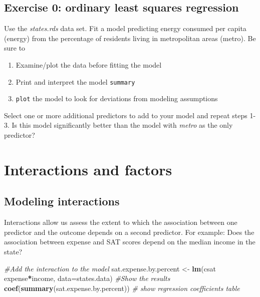 \documentclass[]{book}
\newenvironment{Shaded}{\begin{snugshade}}{\end{snugshade}}
\newcommand{\KeywordTok}[1]{\textcolor[rgb]{0.13,0.29,0.53}{\textbf{#1}}}
\newcommand{\DataTypeTok}[1]{\textcolor[rgb]{0.13,0.29,0.53}{#1}}
\newcommand{\StringTok}[1]{\textcolor[rgb]{0.31,0.60,0.02}{#1}}
\newcommand{\CommentTok}[1]{\textcolor[rgb]{0.56,0.35,0.01}{\textit{#1}}}
\newcommand{\OperatorTok}[1]{\textcolor[rgb]{0.81,0.36,0.00}{\textbf{#1}}}
\newcommand{\NormalTok}[1]{#1}
\providecommand{\tightlist}{%
  \setlength{\itemsep}{0pt}\setlength{\parskip}{0pt}}
\begin{document}
\subsection{Exercise 0: ordinary least squares
regression}\label{exercise-0-ordinary-least-squares-regression}

Use the \emph{states.rds} data set. Fit a model predicting energy
consumed per capita (energy) from the percentage of residents living in
metropolitan areas (metro). Be sure to

\begin{enumerate}
\def\labelenumi{\arabic{enumi}.}
\tightlist
\item
  Examine/plot the data before fitting the model
\item
  Print and interpret the model \texttt{summary}
\item
  \texttt{plot} the model to look for deviations from modeling
  assumptions
\end{enumerate}

Select one or more additional predictors to add to your model and repeat
steps 1-3. Is this model significantly better than the model with
\emph{metro} as the only predictor?

\section{Interactions and factors}\label{interactions-and-factors}

\subsection{Modeling interactions}\label{modeling-interactions}

Interactions allow us assess the extent to which the association between
one predictor and the outcome depends on a second predictor. For
example: Does the association between expense and SAT scores depend on
the median income in the state?

\begin{Shaded}
\begin{Highlighting}[]
    \CommentTok{#Add the interaction to the model}
\NormalTok{  sat.expense.by.percent <-}\StringTok{ }\KeywordTok{lm}\NormalTok{(csat }\OperatorTok{~}\StringTok{ }\NormalTok{expense}\OperatorTok{*}\NormalTok{income,}
                               \DataTypeTok{data=}\NormalTok{states.data) }
  \CommentTok{#Show the results}
    \KeywordTok{coef}\NormalTok{(}\KeywordTok{summary}\NormalTok{(sat.expense.by.percent)) }\CommentTok{# show regression coefficients table}
\end{Highlighting}
\end{Shaded}
\end{document}

